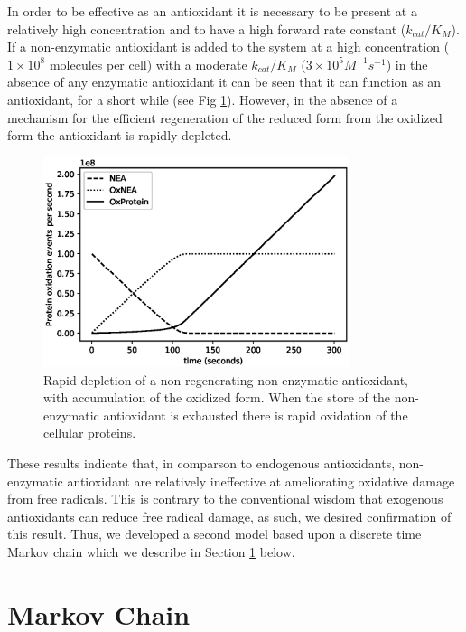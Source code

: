 \documentclass[preprint,12pt,authoryear]{elsarticle}
\begin{document}
In order to be effective as an antioxidant it is necessary to be
present at a relatively high concentration and to have a high forward rate constant ($k_{cat}/K_M$).
If a non-enzymatic antioxidant is added to the system at a high concentration
($1 \times 10^8$ molecules per cell) with a moderate $k_{cat}/K_M$ ($3 \times 10^5 M^{-1} s^{-1}$) in the absence of any
enzymatic antioxidant it can be seen that it can function as an antioxidant, for a short while (see Fig \ref{fig:g3}).
However, in the absence of a mechanism for the efficient regeneration of the
reduced form from the oxidized form the antioxidant is rapidly depleted.


\begin{figure}
\begin{center}
\includegraphics[width=0.8\textwidth]{Fig3.eps}
\end{center}
\caption{\label{fig:g3} Rapid depletion of a non-regenerating non-enzymatic antioxidant, with accumulation of the
oxidized form. When the store of the non-enzymatic antioxidant is exhausted there is rapid oxidation of
the cellular proteins.}
\end{figure}

These results indicate that, in comparson to endogenous antioxidants, non-enzymatic antioxidant are relatively ineffective at ameliorating oxidative damage from free radicals.
This is contrary to the conventional wisdom that exogenous antioxidants can reduce free radical damage, as such, we desired confirmation of this result. Thus, we developed a
second model based upon a discrete time Markov chain which we describe in  Section \ref{sec:mm} below.

\section{Markov Chain}
\label{sec:mm}
\end{document}
